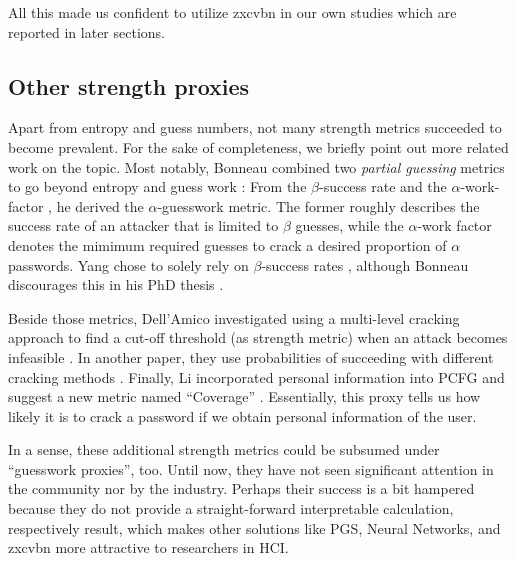 	All this made us confident to utilize zxcvbn in our own studies which are reported in later sections. 
	
	\subsection{Other strength proxies}
	Apart from entropy and guess numbers, not many strength metrics succeeded to become prevalent. For the sake of completeness, we briefly point out more related work on the topic. Most notably, Bonneau combined two \textit{partial guessing} metrics to go beyond entropy and guess work \cite{Bonneau2012ScienceOfGuessing}: From the $\beta$-success rate \cite{Boztas1999Entropies} and the $\alpha$-work-factor \cite{Pliam2000IncomparabilityEntropyGuesswork}, he derived the $\alpha$-guesswork metric. The former roughly describes the success rate of an attacker that is limited to $\beta$ guesses, while the $\alpha$-work factor denotes the mimimum required guesses to crack a desired proportion of $\alpha$ passwords. Yang \etal chose to solely rely on $\beta$-success rates \cite{Yang2016MnemonicSentenceBased}, although Bonneau discourages this in his PhD thesis \cite{Bonneau2012Thesis}. 
	
	Beside those metrics, Dell'Amico \etal investigated using a multi-level cracking approach to find a cut-off threshold (as strength metric) when an attack becomes infeasible \cite{DellAmico2010PasswordStrength}. In another paper, they use probabilities of succeeding with different cracking methods \cite{Dellamico2015MonteCarlo}. Finally, Li \etal incorporated personal information into PCFG and suggest a new metric named ``Coverage'' \cite{Li2017PersonalInformation}. Essentially, this proxy tells us how likely it is to crack a password if we obtain personal information of the user.
	
	In a sense, these additional strength metrics could be subsumed under ``guesswork proxies'', too. Until now, they have not seen significant attention in the community nor by the industry. Perhaps their success is a bit hampered because they do not provide a straight-forward interpretable calculation, respectively result, which makes other solutions like PGS, Neural Networks, and zxcvbn more attractive to researchers in HCI.
	

